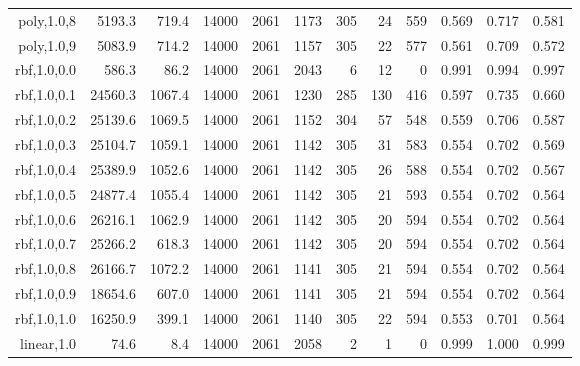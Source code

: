 \begin{longtable}{r|r|r|r|r|r|r|r|r|r|r|r}
   poly,1.0,8  &  5193.3 &   719.4 & 14000 &  2061 &  1173 &   305 &    24 &   559 & 0.569 & 0.717 & 0.581 \\
   poly,1.0,9  &  5083.9 &   714.2 & 14000 &  2061 &  1157 &   305 &    22 &   577 & 0.561 & 0.709 & 0.572 \\
  rbf,1.0,0.0  &   586.3 &    86.2 & 14000 &  2061 &  2043 &     6 &    12 &     0 & 0.991 & 0.994 & 0.997 \\
  rbf,1.0,0.1  & 24560.3 &  1067.4 & 14000 &  2061 &  1230 &   285 &   130 &   416 & 0.597 & 0.735 & 0.660 \\
  rbf,1.0,0.2  & 25139.6 &  1069.5 & 14000 &  2061 &  1152 &   304 &    57 &   548 & 0.559 & 0.706 & 0.587 \\
  rbf,1.0,0.3  & 25104.7 &  1059.1 & 14000 &  2061 &  1142 &   305 &    31 &   583 & 0.554 & 0.702 & 0.569 \\
  rbf,1.0,0.4  & 25389.9 &  1052.6 & 14000 &  2061 &  1142 &   305 &    26 &   588 & 0.554 & 0.702 & 0.567 \\
  rbf,1.0,0.5  & 24877.4 &  1055.4 & 14000 &  2061 &  1142 &   305 &    21 &   593 & 0.554 & 0.702 & 0.564 \\
  rbf,1.0,0.6  & 26216.1 &  1062.9 & 14000 &  2061 &  1142 &   305 &    20 &   594 & 0.554 & 0.702 & 0.564 \\
  rbf,1.0,0.7  & 25266.2 &   618.3 & 14000 &  2061 &  1142 &   305 &    20 &   594 & 0.554 & 0.702 & 0.564 \\
  rbf,1.0,0.8  & 26166.7 &  1072.2 & 14000 &  2061 &  1141 &   305 &    21 &   594 & 0.554 & 0.702 & 0.564 \\
  rbf,1.0,0.9  & 18654.6 &   607.0 & 14000 &  2061 &  1141 &   305 &    21 &   594 & 0.554 & 0.702 & 0.564 \\
  rbf,1.0,1.0  & 16250.9 &   399.1 & 14000 &  2061 &  1140 &   305 &    22 &   594 & 0.553 & 0.701 & 0.564 \\
   linear,1.0  &    74.6 &     8.4 & 14000 &  2061 &  2058 &     2 &     1 &     0 & 0.999 & 1.000 & 0.999 \\
\end{longtable}

